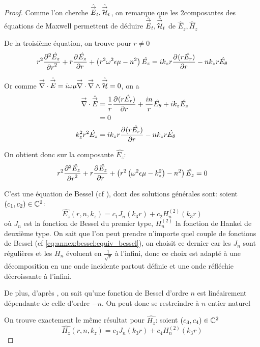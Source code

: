 \begin{proof}
        Comme l'on cherche $\hat \vE_t, \hat \vH_t$, on remarque que les 2\ieme composantes des équations de Maxwell permettent de déduire $\hat\vE_t, \hat\vH_t$ de $ \hat E_z, \hat H_z$

        De la troisième  équation, on trouve pour $r\not=0$
        \begin{equation}
        r^2 \ddr[2]{r}{\hat{E_z}} + r\ddr{r}{\hat{E_z}} + \left(r^2\w^2\eps\mu - n^2\right)\hat{E_z} =ik_zr\ddr{r}{(r\hat{E_r})} -  nk_zr\hat{E_\theta}
        \end{equation}

        Or comme $\vdiv \hat \vE = i\w\mu\vdiv\vrot \hat \vH = 0$, on a
        \begin{align}
            \vdiv\hat \vE &= \frac{1}{r}\ddr{r}{(r\hat{E_r})} + \frac{in}{r}\hat{E_\theta} + ik_z\hat{E_z}
            \\
            &=0
            \\
            k_z^2r^2 \hat{E_z} &= ik_zr\ddr{r}{(r\hat{E_r})} - nk_zr\hat{E_\theta}
        \end{align}

        On obtient donc sur la composante $\hat{E_z}$:
        \begin{equation}
            r^2 \ddr[2]{r}{\hat{E_z}} + r\ddr{r}{\hat{E_z}} + \left(r^2\left(\w^2\eps\mu - k_z^2\right) - n^2\right)\hat{E_z} = 0
        \end{equation}

        C'est une équation de Bessel (cf \cite[eq (6.80)]{bowman_introduction_1958}), dont des solutions générales sont: soient $(c_1,c_2) \in \CC^2$:
       \begin{equation}
            \hat{E_z}(r,n,k_z) = c_1 J_n\left(k_3r\right) + c_2 H_n^{(2)}\left(k_3r\right)
        \end{equation}
        où $J_n$ est la fonction de Bessel du premier type, $H_n^{(2)}$ la fonction de Hankel de deuxième type. On sait que l'on peut prendre n'importe quel couple de fonctions de Bessel (cf \eqref{eq:annex:bessel:equiv_bessel}), on choisit ce dernier car les $J_n$ sont régulières et les $H_n$ évoluent en $\frac{1}{\sqrt{r}}$ à l'infini, donc ce choix est adapté à une décomposition en une onde incidente partout définie et une onde réfléchie décroissante à l'infini.

        De plus, d'après \cite[p.~358]{abramowitz_handbook_1964}, on sait qu'une fonction de Bessel d'ordre $n$ est linéairement dépendante de celle d'ordre $-n$. On peut donc se restreindre à $n$ entier naturel

        On trouve exactement le même résultat pour $\hat{H_z}$: soient $(c_3,c_4) \in \CC^2$
        \begin{equation}
            \hat{H_z}(r,n,k_z) = c_3 J_n\left(k_3r\right) + c_4 H_n^{(2)}\left(k_3r\right)
        \end{equation}
    \end{proof}


